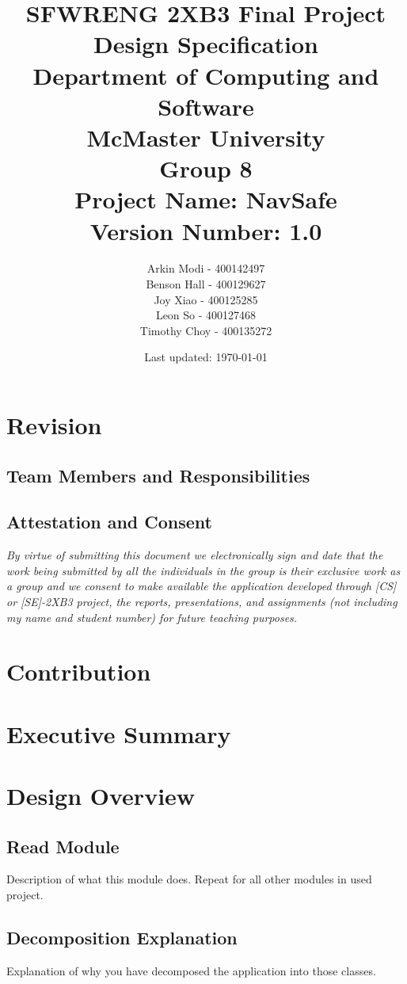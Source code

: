 \documentclass[12pt]{article}
\title{
    SFWRENG 2XB3 Final Project \\
    \large Design Specification\\
    \vspace{1ex}
    \large Department of Computing and Software\\
    \large McMaster University\\
    \vspace{1ex}
    \large Group 8\\
    \large Project Name: NavSafe\\
    \large Version Number: 1.0
}
\author{
    Arkin Modi - 400142497\\
    Benson Hall - 400129627\\
    Joy Xiao - 400125285\\
    Leon So - 400127468\\
    Timothy Choy - 400135272
}
\date{Last updated: \today}
\begin{document}
\maketitle
\newpage

\section{Revision}
    \subsection{Team Members and Responsibilities}


    \subsection{Attestation and Consent}
    \textit{By virtue of submitting this document we electronically sign and date that the work being submitted by all the individuals in the group is their exclusive work as a group and we consent to make available the application developed through [CS] or [SE]-2XB3 project, the reports, presentations, and assignments (not including my name and student number) for future teaching purposes.}
\newpage

\section{Contribution}
\section{Executive Summary}
\newpage

\tableofcontents
\newpage

\section{Design Overview}
    \subsection{Read Module}
    Description of what this module does. Repeat for all other modules in used project.

    \subsection{Decomposition Explanation}
    Explanation of why you have decomposed the application into those classes.
    
\end{document}
